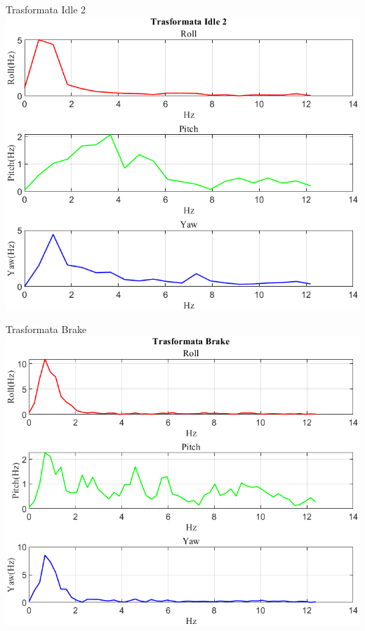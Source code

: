 \documentclass[beamer]{standalone}
\begin{document}
	\begin{frame}{{Trasformata Idle 2}}
		\centering\includegraphics[height=.8\textheight]{figure/VAng/Trasformata/Trasformata Idle 2}
	\end{frame}
	
	\begin{frame}{{Trasformata Brake}}
		\centering\includegraphics[height=.8\textheight]{figure/VAng/Trasformata/Trasformata Brake}
	\end{frame}
	
\end{document}

